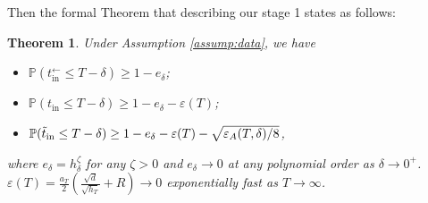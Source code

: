 \documentclass[11pt]{article}
\newcommand{\mb}{\mathbb}
\newcommand{\tin}{t_{\mathrm{in}}}
\newtheorem{theorem}{Theorem}[section]
\begin{document}
Then the formal Theorem that describing our stage 1 states as follows:
\begin{theorem}\label{thm:formal stage 1} Under Assumption \ref{assump:data}, we have
    \begin{itemize}
        \item [(1)] $\mb{P}(\tin^\leftarrow \le T-\delta) \ge 1-e_\delta$;
        \item [(2)] $\mb{P}(\tin \le T-\delta) \ge 1-e_\delta - \varepsilon(T)$;
        \item [(3)] $\mb{P}(\Tilde{t}_{\mathrm{in}} \le T-\delta) \ge 1-e_\delta - \varepsilon(T)-\sqrt{\varepsilon_A(T,\delta)/8}$,
    \end{itemize}
    where $e_\delta=h_\delta^\zeta$ for any $\zeta>0$ and $e_\delta\to 0$ at any polynomial order as $\delta\to 0^+$. $\varepsilon(T)= \frac{a_T}{2}(\frac{\sqrt{d}}{\sqrt{h_T}} + R)\to 0$ exponentially fast as $T\to \infty$.  
\end{theorem}
\end{document}
